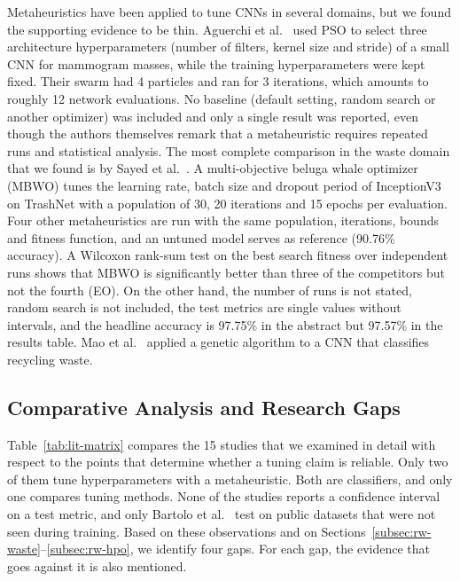 Metaheuristics have been applied to tune CNNs in several domains, but we found the supporting evidence to be thin. Aguerchi et al.~\cite{aguerchi2024cnn} used PSO to select three architecture hyperparameters (number of filters, kernel size and stride) of a small CNN for mammogram masses, while the training hyperparameters were kept fixed. Their swarm had 4 particles and ran for 3 iterations, which amounts to roughly 12 network evaluations. No baseline (default setting, random search or another optimizer) was included and only a single result was reported, even though the authors themselves remark that a metaheuristic requires repeated runs and statistical analysis. The most complete comparison in the waste domain that we found is by Sayed et al.~\cite{sayed2024intelligent}. A multi-objective beluga whale optimizer (MBWO) tunes the learning rate, batch size and dropout period of InceptionV3 on TrashNet with a population of 30, 20 iterations and 15 epochs per evaluation. Four other metaheuristics are run with the same population, iterations, bounds and fitness function, and an untuned model serves as reference (90.76\% accuracy). A Wilcoxon rank-sum test on the best search fitness over independent runs shows that MBWO is significantly better than three of the competitors but not the fourth (EO). On the other hand, the number of runs is not stated, random search is not included, the test metrics are single values without intervals, and the headline accuracy is 97.75\% in the abstract but 97.57\% in the results table. Mao et al.~\cite{mao2021recycling} applied a genetic algorithm to a CNN that classifies recycling waste.

\subsection{Comparative Analysis and Research Gaps}
\label{subsec:gaps}

Table~\ref{tab:lit-matrix} compares the 15 studies that we examined in detail with respect to the points that determine whether a tuning claim is reliable. Only two of them tune hyperparameters with a metaheuristic. Both are classifiers, and only one compares tuning methods. None of the studies reports a confidence interval on a test metric, and only Bartolo et al.~\cite{bartolo2025learning} test on public datasets that were not seen during training. Based on these observations and on Sections~\ref{subsec:rw-waste}--\ref{subsec:rw-hpo}, we identify four gaps. For each gap, the evidence that goes against it is also mentioned.

